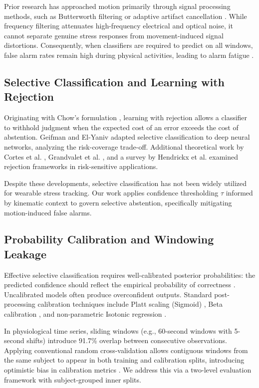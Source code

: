 \documentclass[conference]{IEEEtran}
\begin{document}
Prior research has approached motion primarily through signal processing methods, such as Butterworth filtering or adaptive artifact cancellation \cite{zhang2014troika}. While frequency filtering attenuates high-frequency electrical and optical noise, it cannot separate genuine stress responses from movement-induced signal distortions. Consequently, when classifiers are required to predict on all windows, false alarm rates remain high during physical activities, leading to alarm fatigue \cite{sendelbach2013alarm}.

\subsection{Selective Classification and Learning with Rejection}
Originating with Chow's formulation \cite{chow1970optimum}, learning with rejection allows a classifier to withhold judgment when the expected cost of an error exceeds the cost of abstention. Geifman and El-Yaniv \cite{geifman2017selective, geifman2019selectivenet} adapted selective classification to deep neural networks, analyzing the risk-coverage trade-off. Additional theoretical work by Cortes et al. \cite{cortes2016learning}, Grandvalet et al. \cite{grandvalet2008support}, and a survey by Hendrickx et al. \cite{hendrickx2024machine} examined rejection frameworks in risk-sensitive applications.

Despite these developments, selective classification has not been widely utilized for wearable stress tracking. Our work applies confidence thresholding $\tau$ informed by kinematic context to govern selective abstention, specifically mitigating motion-induced false alarms.

\subsection{Probability Calibration and Windowing Leakage}
Effective selective classification requires well-calibrated posterior probabilities: the predicted confidence should reflect the empirical probability of correctness \cite{guo2017calibration}. Uncalibrated models often produce overconfident outputs. Standard post-processing calibration techniques include Platt scaling (Sigmoid) \cite{platt1999probabilistic}, Beta calibration \cite{kull2017beta}, and non-parametric Isotonic regression \cite{zadrozny2002transforming, niculescu2005predicting}.

In physiological time series, sliding windows (e.g., 60-second windows with 5-second shifts) introduce 91.7\% overlap between consecutive observations. Applying conventional random cross-validation allows contiguous windows from the same subject to appear in both training and calibration splits, introducing optimistic bias in calibration metrics \cite{saeb2017need, little2017using}. We address this via a two-level evaluation framework with subject-grouped inner splits.
\end{document}
